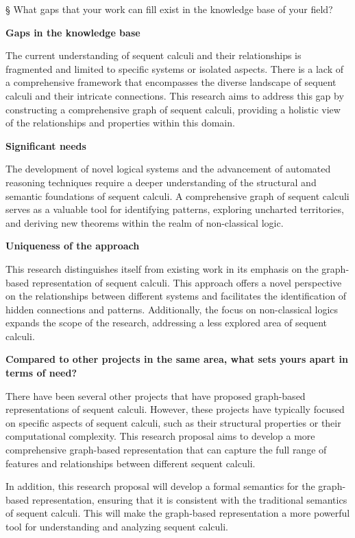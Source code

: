 § What gaps that your work can fill exist in the knowledge base of your
field?

\textbf{Gaps in the knowledge base}

The current understanding of sequent calculi and their relationships is
fragmented and limited to specific systems or isolated aspects. There is
a lack of a comprehensive framework that encompasses the diverse
landscape of sequent calculi and their intricate connections. This
research aims to address this gap by constructing a comprehensive graph
of sequent calculi, providing a holistic view of the relationships and
properties within this domain.

\textbf{Significant needs}

The development of novel logical systems and the advancement of
automated reasoning techniques require a deeper understanding of the
structural and semantic foundations of sequent calculi. A comprehensive
graph of sequent calculi serves as a valuable tool for identifying
patterns, exploring uncharted territories, and deriving new theorems
within the realm of non-classical logic.

\textbf{Uniqueness of the approach}

This research distinguishes itself from existing work in its emphasis on
the graph-based representation of sequent calculi. This approach offers
a novel perspective on the relationships between different systems and
facilitates the identification of hidden connections and patterns.
Additionally, the focus on non-classical logics expands the scope of the
research, addressing a less explored area of sequent calculi.

\textbf{Compared to other projects in the same area, what sets yours
apart in terms of need?}

There have been several other projects that have proposed graph-based
representations of sequent calculi. However, these projects have
typically focused on specific aspects of sequent calculi, such as their
structural properties or their computational complexity. This research
proposal aims to develop a more comprehensive graph-based representation
that can capture the full range of features and relationships between
different sequent calculi.

In addition, this research proposal will develop a formal semantics for
the graph-based representation, ensuring that it is consistent with the
traditional semantics of sequent calculi. This will make the graph-based
representation a more powerful tool for understanding and analyzing
sequent calculi.

